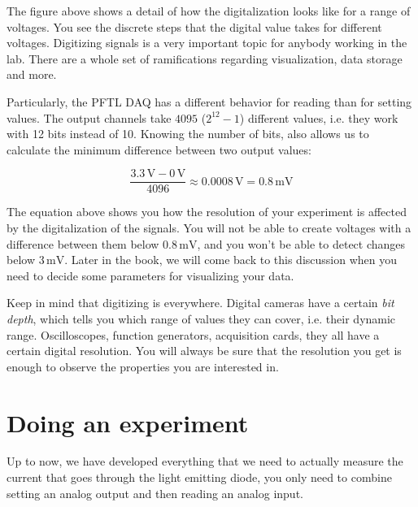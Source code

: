 The figure above shows a detail of how the digitalization looks like for a range of voltages. You see the discrete steps that the digital value takes for different voltages. Digitizing signals is a very important topic for anybody working in the lab. There are a whole set of ramifications regarding visualization, data storage and more. 

Particularly, the {PFTL DAQ} has a different behavior for reading than for setting values. The output channels take $4095$ ($2^{12}-1$) different values, i.e. they work with 12 bits instead of 10. Knowing the number of bits, also allows us to calculate the minimum difference between two output values:

\begin{equation}
 \frac{3.3\,\textrm{V} - 0\,\textrm{V}}{4096} \approx 0.0008\,\textrm{V} = 0.8\,\textrm{mV}
\end{equation}

The equation above shows you how the resolution of your experiment is affected by the digitalization of the signals. You will not be able to create voltages with a difference between them below $0.8\,\textrm{mV}$, and you won't be able to detect changes below $3\,\textrm{mV}$. Later in the book, we will come back to this discussion when you need to decide some parameters for visualizing your data. 

Keep in mind that digitizing is everywhere. Digital cameras have a certain \emph{bit depth}, which tells you which range of values they can cover, i.e. their dynamic range. Oscilloscopes, function generators, acquisition cards, they all have a certain digital resolution. You will always be sure that the resolution you get is enough to observe the properties you are interested in. 

\section{Doing an experiment}
Up to now, we have developed everything that we need to actually measure the current that goes
through the light emitting diode, you only need to combine setting an analog
output and then reading an analog input.



